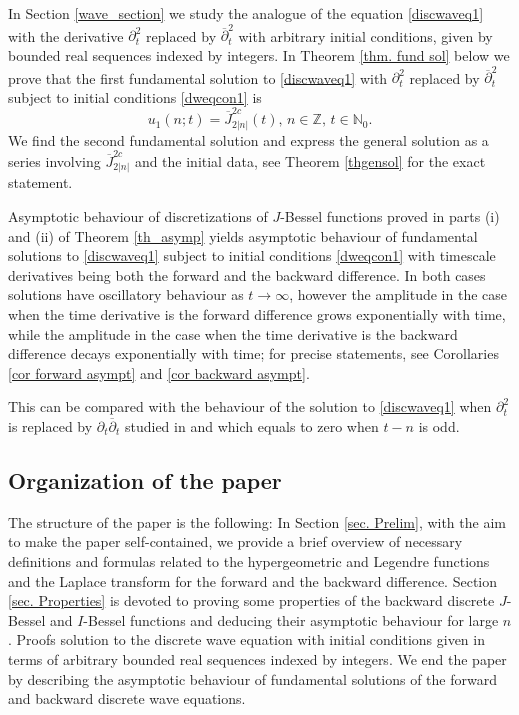 \documentclass[12pt]{amsart}
\numberwithin{equation}{section}
\begin{document}
In Section \ref{wave_section} we study the analogue of the
equation \eqref{discwaveq1} with the derivative $\partial _{t}^{2}$
replaced by $\overline{\partial }_{t}^{2}$ with arbitrary initial
conditions, given by bounded real sequences indexed by integers. In Theorem \ref{thm. fund sol} below we prove that the first fundamental solution to \eqref{discwaveq1} with $\partial _{t}^{2}$ replaced by $\overline{\partial }_{t}^{2}$ subject to initial conditions \eqref{dweqcon1} is
$$
u_{1}\left( n;t\right) =\overline{J}_{2\left\vert n\right\vert }^{2c}\left( t\right)
\text{, \ }n\in \mathbb{Z}\text{, \ }t\in \mathbb{N}_{0}.
$$
We find the second fundamental solution and express the general solution as
a series involving $\overline{J}_{2\left\vert n\right\vert }^{2c}$ and the
initial data, see Theorem \ref{thgensol} for the exact statement.

Asymptotic behaviour of discretizations of $J$-Bessel functions proved in parts (i) and (ii) of Theorem \ref{th_asymp} yields asymptotic behaviour of fundamental solutions to \eqref{discwaveq1} subject to initial conditions \eqref{dweqcon1} with timescale derivatives being both the forward and the backward difference. In both cases solutions have oscillatory behaviour as $t\to \infty$, however the amplitude in the case when the time derivative is the forward difference grows exponentially with time, while the amplitude in the case when the time derivative is the backward difference decays exponentially with time; for precise statements, see Corollaries \ref{cor forward asympt} and \ref{cor backward asympt}.

This can be compared with the behaviour of the solution to \eqref{discwaveq1} when $\partial_t^2$ is replaced by $\partial_t \overline{\partial}_t$ studied in \cite{CP94} and which equals to zero when $t-n$ is odd.

\subsection{Organization of the paper}

The structure of the paper is the following: In Section \ref{sec. Prelim}, with the aim to make the paper self-contained, we provide a brief overview of necessary definitions and formulas related to the hypergeometric and Legendre functions and the Laplace transform for the forward and the backward difference. Section \ref{sec. Properties} is devoted to proving some properties of the backward discrete $J$-Bessel and $I$-Bessel functions and deducing their asymptotic behaviour for large $n$. Proofs solution to the discrete wave equation with initial conditions given in terms of arbitrary bounded real sequences indexed by integers. We end the paper by describing the asymptotic behaviour of fundamental solutions of the forward and backward discrete wave equations.
\end{document}
